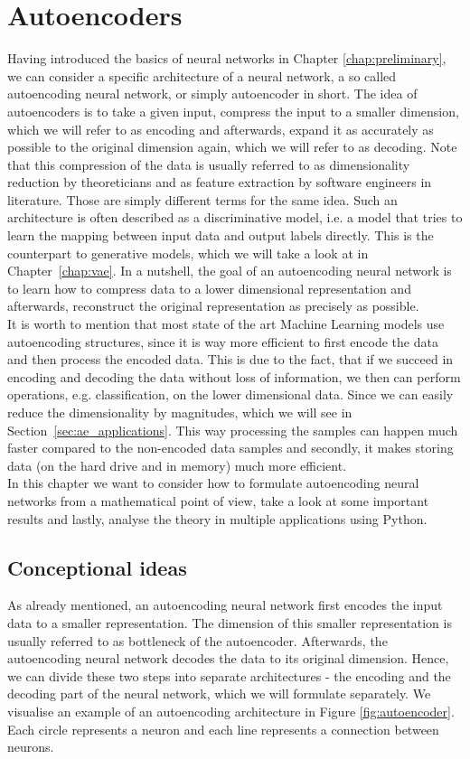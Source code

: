 \chapter{Autoencoders}\label{chap:ae}
Having introduced the basics of neural networks in Chapter \ref{chap:preliminary}, we can consider a specific architecture of a neural network, a so called autoencoding neural network, or simply autoencoder in short. The idea of autoencoders is to take a given input, compress the input to a smaller dimension, which we will refer to as encoding and afterwards, expand it as accurately as possible to the original dimension again, which we will refer to as decoding. Note that this compression of the data is usually referred to as dimensionality reduction by theoreticians and as feature extraction by software engineers in literature. Those are simply different terms for the same idea. Such an architecture is often described as a discriminative model, i.e. a model that tries to learn the mapping between input data and output labels directly. This is the counterpart to generative models, which we will take a look at in Chapter~\ref{chap:vae}. In a nutshell, the goal of an autoencoding neural network is to learn how to compress data to a lower dimensional representation and afterwards, reconstruct the original representation as precisely as possible.\\
It is worth to mention that most state of the art Machine Learning models use autoencoding structures, since it is way more efficient to first encode the data and then process the encoded data.  This is due to the fact, that if we succeed in encoding and decoding the data without loss of information, we then can perform operations, e.g. classification, on the lower dimensional data. Since we can easily reduce the dimensionality by magnitudes, which we will see in Section~\ref{sec:ae_applications}. This way processing the samples can happen much faster compared to the non-encoded data samples and secondly, it makes storing data (on the hard drive and in memory) much more efficient.\\
In this chapter we want to consider how to formulate autoencoding neural networks from a mathematical point of view, take a look at some important results and lastly, analyse the theory in multiple applications using Python.

\section{Conceptional ideas}
As already mentioned, an autoencoding neural network first encodes the input data to a smaller representation. The dimension of this smaller representation is usually referred to as bottleneck of the autoencoder.
Afterwards, the autoencoding neural network decodes the data to its original dimension. Hence, we can divide these two steps into separate architectures - the encoding and the decoding part of the neural network, which we will formulate separately. We visualise an example of an autoencoding architecture in Figure \ref{fig:autoencoder}. Each circle represents a neuron and each line represents a connection between neurons.


